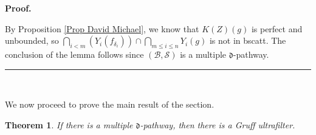 \documentclass{article}%
\newtheorem{theorem}{Theorem}
\newenvironment{proof}[1][Proof]{\noindent\textbf{#1.} }{\ \rule{0.5em}{0.5em}}
\begin{document}
\begin{proof}
\qquad\ \ \ \ \qquad\ \ \ \ \ \qquad\ \ \ \bigskip

By Proposition \ref{Prop David Michael}, we know that $K\left(  Z\right)
\left(  g\right)  $ is perfect and unbounded, so $%
{\textstyle\bigcap\limits_{i<m}}
\left(  Y_{i}\left(  f_{\delta_{i}}\right)  \right)  \cap%
{\textstyle\bigcap\limits_{m\leq i\leq n}}
Y_{i}\left(  g\right)  $ is not in \textsf{bscatt. }The conclusion of the
lemma follows since $\left(  \mathcal{B},\mathcal{S}\right)  $ is a multiple
$\mathfrak{d}$-pathway.
\end{proof}

\qquad\ \ \ \qquad\ \ 

We now proceed to prove the main result of the section.

\begin{theorem}
If there is a multiple $\mathfrak{d}$-pathway, then there is a Gruff ultrafilter.
\end{theorem}
\end{document}
